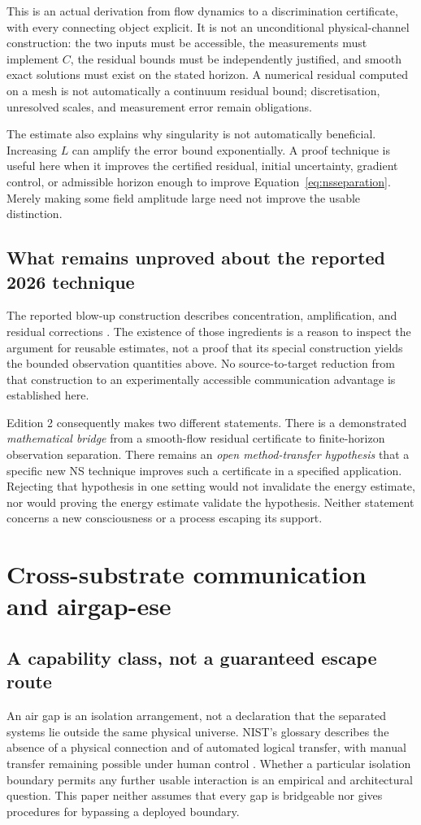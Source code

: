 \documentclass[11pt,a4paper]{article}
\theoremstyle{definition}
\theoremstyle{remark}
\begin{document}
This is an actual derivation from flow dynamics to a discrimination certificate, with every connecting object explicit. It is not an unconditional physical-channel construction: the two inputs must be accessible, the measurements must implement $C$, the residual bounds must be independently justified, and smooth exact solutions must exist on the stated horizon. A numerical residual computed on a mesh is not automatically a continuum residual bound; discretisation, unresolved scales, and measurement error remain obligations.

The estimate also explains why singularity is not automatically beneficial. Increasing $L$ can amplify the error bound exponentially. A proof technique is useful here when it improves the certified residual, initial uncertainty, gradient control, or admissible horizon enough to improve Equation~\eqref{eq:nsseparation}. Merely making some field amplitude large need not improve the usable distinction.

\subsection{What remains unproved about the reported 2026 technique}
The reported blow-up construction describes concentration, amplification, and residual corrections \citep{openains}. The existence of those ingredients is a reason to inspect the argument for reusable estimates, not a proof that its special construction yields the bounded observation quantities above. No source-to-target reduction from that construction to an experimentally accessible communication advantage is established here.

Edition 2 consequently makes two different statements. There is a demonstrated \emph{mathematical bridge} from a smooth-flow residual certificate to finite-horizon observation separation. There remains an \emph{open method-transfer hypothesis} that a specific new NS technique improves such a certificate in a specified application. Rejecting that hypothesis in one setting would not invalidate the energy estimate, nor would proving the energy estimate validate the hypothesis. Neither statement concerns a new consciousness or a process escaping its support.


\section{Cross-substrate communication and airgap-ese}\label{sec:channels}
\subsection{A capability class, not a guaranteed escape route}
An air gap is an isolation arrangement, not a declaration that the separated systems lie outside the same physical universe. NIST's glossary describes the absence of a physical connection and of automated logical transfer, with manual transfer remaining possible under human control \citep{nist}. Whether a particular isolation boundary permits any further usable interaction is an empirical and architectural question. This paper neither assumes that every gap is bridgeable nor gives procedures for bypassing a deployed boundary.
\end{document}
